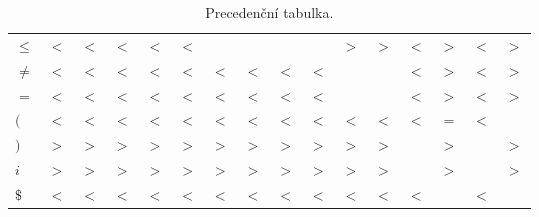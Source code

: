 \documentclass[a4paper, 12pt]{article}
\begin{document}
\begin{table}[h]
\begin{tabular}[p]{| l | c | c | c | c | c | c | c | c | c | c | c | c | c | c | c |}
            \textbf{$\leq$} &
                $<$ & $<$ & $<$ & $<$ & $<$ &     &     &     &     & $>$ & $>$ & $<$ & $>$ & $<$ & $>$ \\
            \textbf{$\neq$} &
                $<$ & $<$ & $<$ & $<$ & $<$ & $<$ & $<$ & $<$ & $<$ &     &     & $<$ & $>$ & $<$ & $>$ \\
            \textbf{$=$} &
                $<$ & $<$ & $<$ & $<$ & $<$ & $<$ & $<$ & $<$ & $<$ &     &     & $<$ & $>$ & $<$ & $>$ \\
            \textbf{$($} &
                $<$ & $<$ & $<$ & $<$ & $<$ & $<$ & $<$ & $<$ & $<$ & $<$ & $<$ & $<$ & $=$ & $<$ &     \\
            \textbf{$)$} &
                $>$ & $>$ & $>$ & $>$ & $>$ & $>$ & $>$ & $>$ & $>$ & $>$ & $>$ &     & $>$ &     & $>$ \\
            \textbf{$i$} &
                $>$ & $>$ & $>$ & $>$ & $>$ & $>$ & $>$ & $>$ & $>$ & $>$ & $>$ &     & $>$ &     & $>$ \\
            \textbf{$\$$} &
                $<$ & $<$ & $<$ & $<$ & $<$ & $<$ & $<$ & $<$ & $<$ & $<$ & $<$ & $<$ &     & $<$ &     \\
            \hline
        \end{tabular}
        \caption{Precedenční tabulka.}
        \label{tabulka precedence}
    \end{table}

    \newpage
	\renewcommand{\refname}{Zdroje}
	\printbibliography
\end{document}

